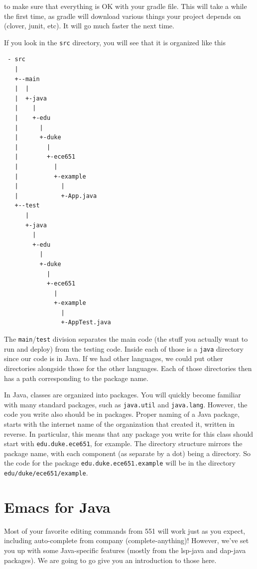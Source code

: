 \documentclass[12pt]{article}
\begin{document}
to make sure that everything is OK with your gradle file.  This will
take a while the first time, as gradle will download various
things your project depends on (clover, junit, etc). It will go
much faster the next time.



 If you look in the \verb+src+ directory, you
will see that it is organized like this
\begin{verbatim}
 - src 
   | 
   +--main 
   |  | 
   |  +-java 
   |    |  
   |    +-edu
   |      |
   |      +-duke
   |        |
   |        +-ece651
   |          |
   |          +-example
   |            |
   |            +-App.java
   +--test 
      |
      +-java 
        |  
        +-edu
          |
          +-duke
            |
            +-ece651
              |
              +-example
                |
                +-AppTest.java
\end{verbatim}

The \verb+main+/\verb+test+ division separates the main code (the
stuff you actually want to run and deploy) from the testing code.
Inside each of those is a \verb+java+ directory since our code is in
Java.  If we had other languages, we could put other directories
alongside those for the other languages.  Each of those directories
then has a path corresponding to the package name.  

In Java, classes are organized into packages.  You will quickly become
familiar with many standard packages, such as \verb+java.util+ and
\verb+java.lang+.  However, the code you write also should be in
packages.    Proper naming of a Java
package, starts with the internet name of the organization
that created it, written in reverse.  In particular, this means that
any package you write for this class should start with
\verb+edu.duke.ece651+, for example.  The directory structure
mirrors the package name, with each component (as separate
by a dot) being a directory.  So the code for the package
\verb+edu.duke.ece651.example+ will be in the directory
\verb+edu/duke/ece651/example+.

\section{Emacs for Java}
Most of your favorite editing commands from 551 will work just as you expect,
including auto-complete from company (complete-anything)!
However, we've set you up with some Java-specific features (mostly from
the lsp-java and dap-java packages). We are going to go give you an introduction
to those here.
\end{document}
